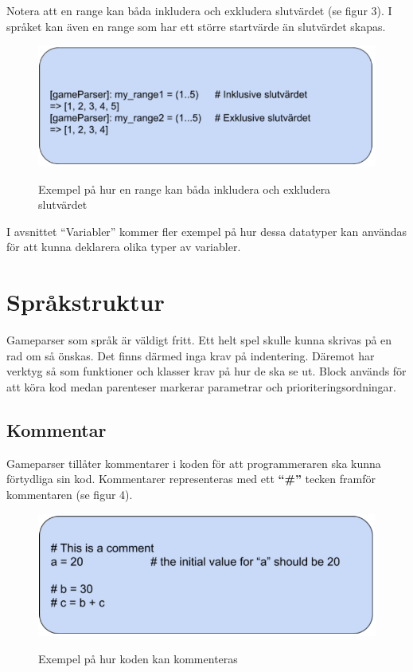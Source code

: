 \documentclass{Dokumentmall}
\begin{document}
Notera att en range kan båda inkludera och exkludera slutvärdet (se figur 3). I språket kan även en range som har ett större startvärde än slutvärdet skapas.
\begin{figure}[h!]
  \centering
  \includegraphics[scale = 0.65]{Images/Figur3.png}
  \label{}
  \caption{Exempel på hur en range kan båda inkludera och exkludera slutvärdet}
\end{figure}

I avsnittet “Variabler” kommer fler exempel på hur dessa datatyper kan användas för att kunna deklarera olika typer av variabler.

\newpage
\section{Språkstruktur}
Gameparser som språk är väldigt fritt. Ett helt spel skulle kunna skrivas på en rad om så önskas. Det finns därmed inga krav på indentering. Däremot har verktyg så som funktioner och klasser krav på hur de ska se ut. Block {} används för att köra kod medan parenteser markerar parametrar och prioriteringsordningar. 

\subsection{Kommentar}
Gameparser tillåter kommentarer i koden för att programmeraren ska kunna förtydliga sin kod. Kommentarer representeras med ett \textbf{``\#''} tecken framför kommentaren (se figur 4).

\begin{figure}[h!]
  \centering
  \includegraphics[scale = 0.65]{Images/Figur4.png}
  \label{}
  \caption{Exempel på hur koden kan kommenteras}
\end{figure}
\end{document}
